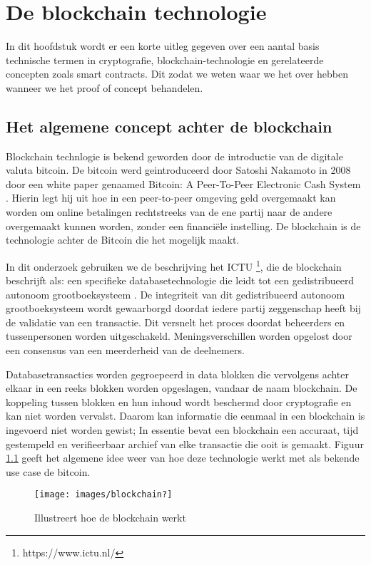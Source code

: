 \chapter{De blockchain technologie}\label{chap:q1}
In dit hoofdstuk wordt er een korte uitleg gegeven over een aantal basis technische termen in cryptografie, blockchain-technologie en gerelateerde concepten zoals smart contracts. Dit zodat we weten waar we het over hebben wanneer we het proof of concept behandelen.

\section{Het algemene concept achter de blockchain}
Blockchain technlogie is bekend geworden door de introductie van de digitale valuta bitcoin. De bitcoin werd geintroduceerd door Satoshi Nakamoto in 2008 door een white paper genaamed Bitcoin: A Peer-To-Peer Electronic Cash System \cite{bitcoinPaper}. Hierin legt hij uit hoe in een peer-to-peer omgeving geld overgemaakt kan worden om online betalingen rechtstreeks van de ene partij naar de andere overgemaakt kunnen worden, zonder een financiële instelling. De blockchain is de technologie achter de Bitcoin die het mogelijk maakt.\par

In dit onderzoek gebruiken we de beschrijving het ICTU \footnote{https://www.ictu.nl/}, die de blockchain beschrijft als: een specifieke databasetechnologie die leidt tot een gedistribueerd autonoom grootboeksysteem \cite{kaptijn}. De integriteit van dit gedistribueerd autonoom grootboeksysteem wordt gewaarborgd doordat iedere partij zeggenschap heeft bij de validatie van een transactie. Dit versnelt het proces doordat beheerders en tussenpersonen worden uitgeschakeld. Meningsverschillen worden opgelost door een consensus van een meerderheid van de deelnemers.\par

Databasetransacties worden gegroepeerd in data blokken die vervolgens achter elkaar in een reeks blokken worden opgeslagen, vandaar de naam blockchain. De koppeling tussen blokken en hun inhoud wordt beschermd door cryptografie en kan niet worden vervalst. Daarom kan informatie die eenmaal in een blockchain is ingevoerd niet worden gewist; In essentie bevat een blockchain een accuraat, tijd gestempeld en verifieerbaar archief van elke transactie die ooit is gemaakt. Figuur \ref{fig:blockchain?} geeft het algemene idee weer van hoe deze technologie werkt met als bekende use case de bitcoin.
\begin{figure}
    \begin{center}
        \texttt{[image: images/blockchain?]}
        \caption{Illustreert hoe de blockchain werkt \cite{howBlockchainWorks}}
        \label{fig:blockchain?}
    \end{center}
\end{figure}
\newpage


